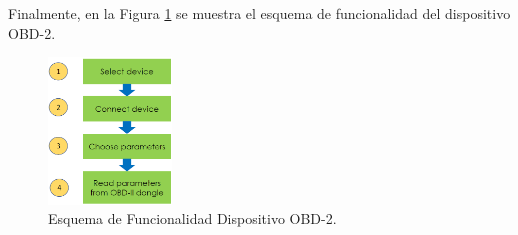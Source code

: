 \documentclass[a4paper,10pt, oneside, titlepage]{article}
\begin{document}
	\indent Finalmente, en la Figura \ref{Esquema_Funcionalidad_OBD} se muestra el esquema de funcionalidad del dispositivo OBD-2.
	\begin{figure}[!h]
		\centering
		\includegraphics[width = 0.45\linewidth, height = 3.9cm]{Esquema_Funcionalidad_OBD.png}
		\caption{Esquema de Funcionalidad Dispositivo OBD-2.}
		\label{Esquema_Funcionalidad_OBD}
	\end{figure}
\end{document}
